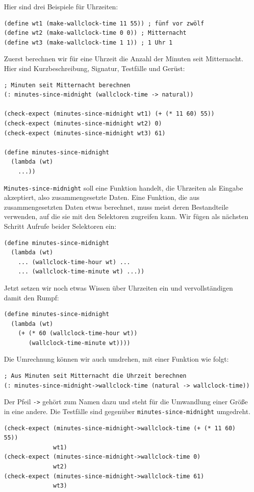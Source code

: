 Hier sind drei Beispiele für Uhrzeiten:
%
\begin{verbatim}
(define wt1 (make-wallclock-time 11 55)) ; fünf vor zwölf
(define wt2 (make-wallclock-time 0 0)) ; Mitternacht
(define wt3 (make-wallclock-time 1 1)) ; 1 Uhr 1
\end{verbatim}
%
Zuerst berechnen wir für eine Uhrzeit die Anzahl der Minuten
seit Mitternacht.  Hier sind Kurzbeschreibung, Signatur, Testfälle und Gerüst:
%
\begin{verbatim}
; Minuten seit Mitternacht berechnen
(: minutes-since-midnight (wallclock-time -> natural))

(check-expect (minutes-since-midnight wt1) (+ (* 11 60) 55))
(check-expect (minutes-since-midnight wt2) 0)
(check-expect (minutes-since-midnight wt3) 61)

(define minutes-since-midnight
  (lambda (wt)
    ...))
\end{verbatim}
%
\texttt{Minutes-since-midnight} soll eine Funktion handelt, die
Uhrzeiten als Eingabe akzeptiert, also zusammengesetzte Daten.  Eine
Funktion, die aus zusammengesetzten Daten etwas berechnet, muss meist
deren Bestandteile verwenden, auf die sie mit den Selektoren zugreifen
kann.  Wir fügen als nächsten Schritt Aufrufe beider Selektoren ein:
%
\begin{verbatim}
(define minutes-since-midnight
  (lambda (wt)
    ... (wallclock-time-hour wt) ...
    ... (wallclock-time-minute wt) ...))
\end{verbatim}
%
Jetzt setzen wir noch etwas Wissen über Uhrzeiten ein und
vervollständigen damit den Rumpf:
%
\begin{verbatim}
(define minutes-since-midnight
  (lambda (wt)
    (+ (* 60 (wallclock-time-hour wt))
       (wallclock-time-minute wt))))
\end{verbatim}
%
Die Umrechnung können wir auch umdrehen, mit einer Funktion wie folgt:
%
\begin{verbatim}
; Aus Minuten seit Mitternacht die Uhrzeit berechnen
(: minutes-since-midnight->wallclock-time (natural -> wallclock-time))
\end{verbatim}
%
Der Pfeil \verb|->| gehört zum Namen dazu und steht für die Umwandlung
einer Größe in eine andere.  Die Testfälle sind gegenüber
\texttt{minutes-since-midnight} umgedreht.
%
\begin{verbatim}
(check-expect (minutes-since-midnight->wallclock-time (+ (* 11 60) 55))
              wt1)
(check-expect (minutes-since-midnight->wallclock-time 0)
              wt2)
(check-expect (minutes-since-midnight->wallclock-time 61)
              wt3)
\end{verbatim}

